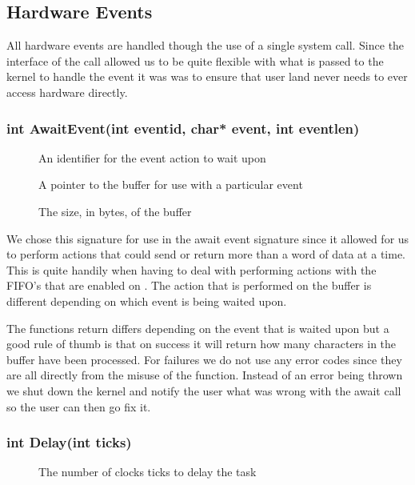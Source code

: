 \documentclass[pdftex,10pt,a4paper]{article}
\begin{document}
\subsection*{Hardware Events}

All hardware events are handled though the use of a single system call. Since
the interface of the call allowed us to be quite flexible with what is passed
to the kernel to handle the event it was was to ensure that user land never
needs to ever access hardware directly.

\subsubsection*{int AwaitEvent(int eventid, char* event, int eventlen)}

\begin{description}
\item[] An identifier for the event action to wait upon
\item[] A pointer to the buffer for use with a particular event
\item[] The size, in bytes, of the  buffer
\end{description}

We chose this signature for use in the await event signature since it allowed
for us to perform actions that could send or return more than a word of data
at a time. This is quite handily when having to deal with performing actions
with the FIFO's that are enabled on . The action that is performed
on the buffer is different depending on which event is being waited upon.

The functions return differs depending on the event that is waited upon but a
good rule of thumb is that on success it will return how many characters in the
buffer have been processed. For failures we do not use any error codes since
they are all directly from the misuse of the function. Instead of an error
being thrown we shut down the kernel and notify the user what was wrong with
the await call so the user can then go fix it.


\subsubsection*{int Delay(int ticks)}

\begin{description}
\item[] The number of clocks ticks to delay the task
\end{description}
\end{document}
